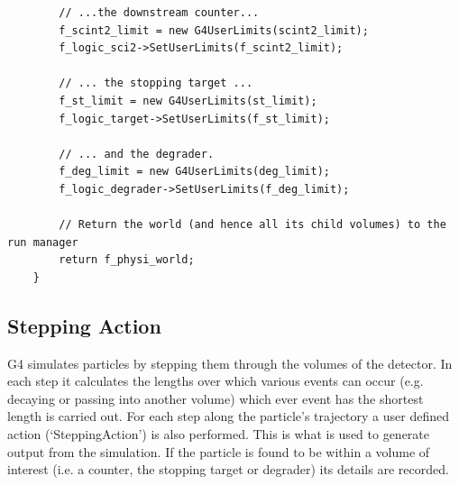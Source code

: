 \documentclass[]{article}
\begin{document}
\begin{verbatim}
        // ...the downstream counter...
        f_scint2_limit = new G4UserLimits(scint2_limit);
        f_logic_sci2->SetUserLimits(f_scint2_limit);
        
        // ... the stopping target ...
        f_st_limit = new G4UserLimits(st_limit);
        f_logic_target->SetUserLimits(f_st_limit);
    
        // ... and the degrader.
        f_deg_limit = new G4UserLimits(deg_limit);
        f_logic_degrader->SetUserLimits(f_deg_limit);
    
        // Return the world (and hence all its child volumes) to the run manager
        return f_physi_world;
    }
\end{verbatim}
\subsection{Stepping Action} %
\label{appsub:stepping_action}
G4 simulates particles by stepping them through the volumes of the detector. In each step it calculates the lengths over which various events can occur (e.g. decaying or passing into another volume) which ever event has the shortest length is carried out. For each step along the particle's trajectory a user defined action (`SteppingAction') is also performed. This is what is used to generate output from the simulation. If the particle is found to be within a volume of interest (i.e. a counter, the stopping target or degrader) its details are recorded.
\end{document}
